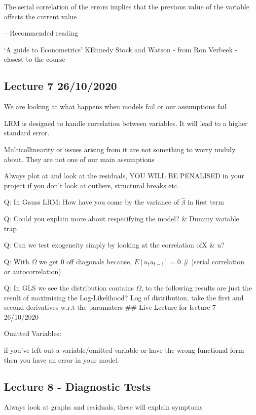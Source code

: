 \documentclass[]{article}
\begin{document}
The serial correlation of the errors implies that the previous value of
the variable affects the current value

-- Recommended reading

`A guide to Econometrics' KEnnedy Stock and Watson - from Ron Verbeek -
closest to the course

\subsection{Lecture 7 26/10/2020}\label{lecture-7-26102020}

We are looking at what happens when models fail or our assumptions fail

LRM is designed to handle correlation between variables. It will lead to
a higher standard error.

Multicollinearity or issues arising from it are not something to worry
unduly about. They are not one of our main assumptions

Always plot at and look at the residuals, YOU WILL BE PENALISED in your
project if you don't look at outliers, structural breaks etc.

Q: In Gauss LRM: How have you come by the variance of \(\hat \beta\) in
first term

Q: Could you explain more about respecifying the model? \& Dummy
variable trap

Q: Can we test exogeneity simply by looking at the correlation ofX \& u?

Q: With \(\Omega\) we get 0 off diagonals because,
\(E[u_t u_{t-i}] = 0\) \# (serial correlation or autocorrelation)

Q: In GLS we see the distribution contains \(\Omega\), to the following
results are just the result of maximising the Log-Likelihood? Log of
distribution, take the first and second derivatives w.r.t the paramaters
\#\# Live Lecture for lecture 7 26/10/2020

Omitted Variables:

if you've left out a variable/omitted variable or have the wrong
functional form then you have an error in your model.

\subsection{Lecture 8 - Diagnostic
Tests}\label{lecture-8---diagnostic-tests}

Always look at graphs and residuals, these will explain symptoms
\end{document}
